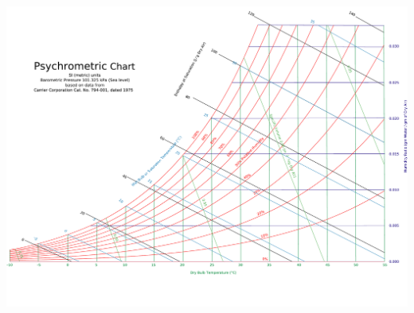 \documentclass[calculator,datasheet,sample]{exam}
\begin{document}
\begin{landscape}
\begin{center}
\includegraphics[width=1.5\textwidth]{./Pics/PsychrometricChart}
\end{center}
\end{landscape}
{

  
  
  
}

\end{document}
